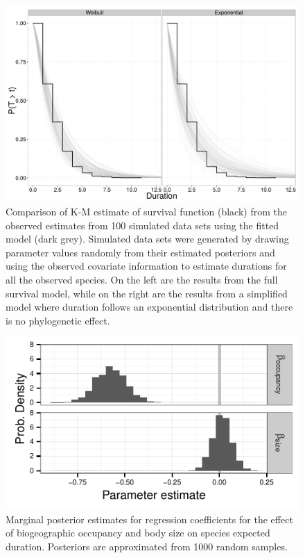 \documentclass[12pt]{article}
\begin{document}
\begin{figure}[ht]
  \centering
  \includegraphics[height = 0.5\textheight, width = \textwidth, keepaspectratio = true]{figure/survival_function}
  \caption{Comparison of K-M estimate of survival function (black) from the observed estimates from 100 simulated data sets using the fitted model (dark grey). Simulated data sets were generated by drawing parameter values randomly from their estimated posteriors and using the observed covariate information to estimate durations for all the observed species. On the left are the results from the full survival model, while on the right are the results from a simplified model where duration follows an exponential distribution and there is no phylogenetic effect.}
  \label{fig:ppc_surv}
\end{figure}

\begin{figure}[ht]
  \centering
  \includegraphics[height = 0.5\textheight, width = \textwidth, keepaspectratio = true]{figure/other_est}
  \caption{Marginal posterior estimates for regression coefficients for the effect of biogeographic occupancy and body size on species expected duration. Posteriors are approximated from 1000 random samples.}
  \label{fig:eff_other}
\end{figure}
\end{document}
